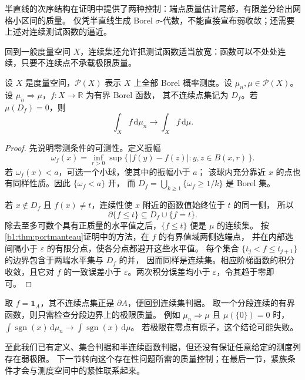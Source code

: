 半直线的次序结构在证明中提供了两种控制：端点质量估计尾部，有限差分给出网格小区间的质量。
仅凭半直线生成 Borel \(\sigma\)-代数，不能直接宣布弱收敛；还需要上述对连续测试函数的逼近。

\ProseParagraphBreak

回到一般度量空间 \(X\)，连续集还允许把测试函数适当放宽：函数可以不处处连续，只要不连续点不承载极限质量。

\begin{proposition}\label{b1:prop:weak-ae-continuous-test}
设 \(X\) 是度量空间，\(\mathcal P(X)\) 表示 \(X\) 上全部 Borel 概率测度。设 \(\mu_n,\mu\in\mathcal P(X)\)。设 \(\mu_n\Rightarrow\mu\)，\(f:X\to\mathbb R\) 为有界 Borel 函数，
其不连续点集记为 \(D_f\)。若 \(\mu(D_f)=0\)，则
\[
 \int_X f\,\mathrm{d}\mu_n\longrightarrow\int_X f\,\mathrm{d}\mu.
\]
\end{proposition}
\begin{proof}
先说明零测条件的可测性。定义振幅
\[
 \omega_f(x)=\inf_{r>0}\sup\{\,|f(y)-f(z)|:y,z\in B(x,r)\,\}.
\]
若 \(\omega_f(x)<a\)，可选一个小球，使其中的振幅小于 \(a\)；
该球内充分靠近 \(x\) 的点也有同样性质。因此 \(\{\omega_f<a\}\) 开，
而 \(D_f=\bigcup_{k\geq1}\{\omega_f\geq1/k\}\) 是 Borel 集。

若 \(x\notin D_f\) 且 \(f(x)\ne t\)，连续性使 \(x\) 附近的函数值始终位于 \(t\) 的同一侧，
所以
\[
 \partial\{f\leq t\}\subseteq D_f\cup\{f=t\}.
\]
除去至多可数个具有正质量的水平值之后，\(\{f\leq t\}\) 便是 \(\mu\) 的连续集。
按\cref{b1:thm:portmanteau}证明中的方法，在 \(f\) 的有界值域两侧选端点，
并在内部选间隔小于 \(\varepsilon\) 的有限分点，使各分点都避开这些水平值。
每个集合 \(\{t_j<f\leq t_{j+1}\}\) 的边界包含于两端水平集与 \(D_f\) 的并，
因而同样是连续集。相应阶梯函数的积分收敛，且它对 \(f\) 的一致误差小于
\(\varepsilon\)。两次积分误差均小于 \(\varepsilon\)，令其趋于零即可。
\end{proof}

取 \(f=\mathbf1_A\)，其不连续点集正是 \(\partial A\)，便回到连续集判据。
取一个分段连续的有界函数，则只需检查分段边界上的极限质量。
例如 \(\mu_n\Rightarrow\mu\) 且 \(\mu(\{0\})=0\) 时，
\(\int\operatorname{sgn}(x)\,\mathrm{d}\mu_n\to\int\operatorname{sgn}(x)\,\mathrm{d}\mu\)。
若极限在零点有原子，这个结论可能失败。

\ProseParagraphBreak

至此我们已有定义、集合判据和半连续函数判据，但还没有保证任意给定的测度列存在弱极限。
下一节转向这个存在性问题所需的质量控制；在最后一节，紧族条件才会与测度空间中的紧性联系起来。
